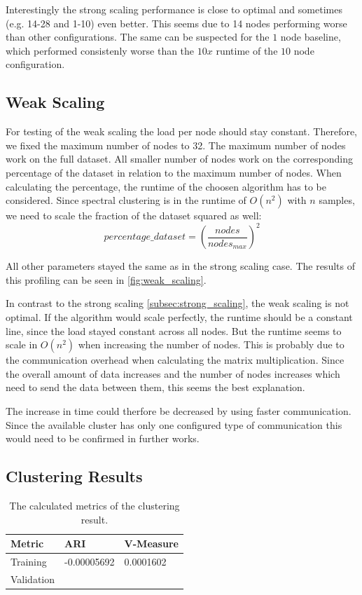 Interestingly the strong scaling performance is close to optimal and sometimes (e.g. 14-28 and 1-10) even better.
This seems due to 14 nodes performing worse than other configurations.
The same can be suspected for the \(1\) node baseline, which performed consistenly worse than the \(10x\) runtime of the \(10\) node configuration.

\subsection{Weak Scaling}
\label{subsec:weak_scaling}

For testing of the weak scaling the load per node should stay constant. Therefore, we fixed the
maximum number of nodes to 32.
The maximum number of nodes work on the full dataset. All smaller number of nodes work on the corresponding
percentage of the dataset in relation to the maximum number of nodes. When calculating the percentage, the runtime
of the choosen algorithm has to be considered. Since spectral clustering is in the runtime of \(O(n^2)\) with \(n\) samples,
we need to scale the fraction of the dataset squared as well:
\[percentage\_dataset = \left(\frac{nodes}{nodes_{max}}\right)^2\]

All other parameters stayed the same as in the strong scaling case.
The results of this profiling can be seen in \cref{fig:weak_scaling}.

In contrast to the strong scaling \cref{subsec:strong_scaling}, the weak scaling is not optimal. If the algorithm would scale perfectly, the runtime should be a
constant line, since the load stayed constant across all nodes. But the runtime seems to scale in \(O(n^2)\) when increasing the number of nodes.
This is probably due to the communication overhead when calculating the matrix multiplication.
Since the overall amount of data increases and the number of nodes increases which need to send the data between them, this seems the best explanation.

The increase in time could therfore be decreased by using faster communication. Since the available cluster has only one configured type of communication
this would need to be confirmed in further works.


\subsection{Clustering Results}
\label{subsec:clustering_results}

\begin{table}
    \centering
    \begin{tabular}{lll}
      \toprule
      Metric     &  ARI & V-Measure \\
      \midrule
      Training   &  -0.00005692  &  0.0001602     \\
      Validation &   & \\
      \bottomrule
    \end{tabular}
    \caption{The calculated metrics of the clustering result.}
    \label{tab:clustering_results}
  \end{table}

